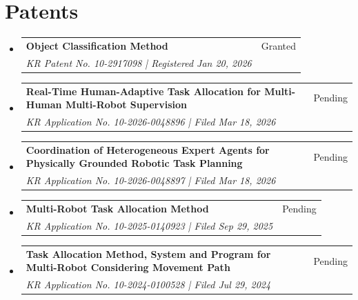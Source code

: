 \documentclass[letterpaper,10pt]{article}
\makeatletter
\newcommand{\resumePublicationWithYear}[4]{
  \item
    \begin{tabular*}{0.97\textwidth}[t]{l@{\extracolsep{\fill}}r}
      \textbf{#1} & #2 \\
      \textit{#3} & \\
    \end{tabular*}
    #4 \vspace{-1pt}
}
\newcommand{\resumeSubHeadingListStart}{\begin{itemize}[leftmargin=0.in, label={}]}
\newcommand{\resumeSubHeadingListEnd}{\end{itemize}}
\makeatother
\begin{document}
\section{Patents}
\vspace{-2pt}
\resumeSubHeadingListStart
    \resumePublicationWithYear
      {Object Classification Method}
      {Granted}
      {KR Patent No. 10-2917098 | Registered Jan 20, 2026}
      {}
    \vspace{-5pt}
    \resumePublicationWithYear
      {Real-Time Human-Adaptive Task Allocation for Multi-Human Multi-Robot Supervision}
      {Pending}
      {KR Application No. 10-2026-0048896 | Filed Mar 18, 2026}
      {}
    \vspace{-5pt}
    \resumePublicationWithYear
      {Coordination of Heterogeneous Expert Agents for Physically Grounded Robotic Task Planning}
      {Pending}
      {KR Application No. 10-2026-0048897 | Filed Mar 18, 2026}
      {}
    \vspace{-5pt}
    \resumePublicationWithYear
      {Multi-Robot Task Allocation Method}
      {Pending}
      {KR Application No. 10-2025-0140923 | Filed Sep 29, 2025}
      {}
    \vspace{-5pt}
    \resumePublicationWithYear
      {Task Allocation Method, System and Program for Multi-Robot Considering Movement Path}
      {Pending}
      {KR Application No. 10-2024-0100528 | Filed Jul 29, 2024}
      {}
\resumeSubHeadingListEnd
\vspace{-5pt}
\end{document}

